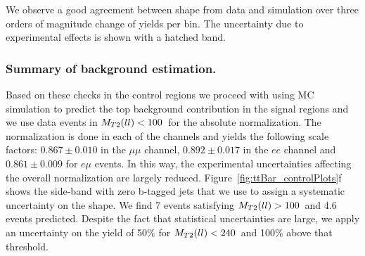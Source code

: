 We observe a good agreement between \mtll shape from data and simulation over three orders of magnitude change of yields per bin. 
The uncertainty due to experimental effects is shown with a hatched band.

\subsubsection{Summary of \texorpdfstring{\ttbar}{ttbar} background estimation.}

Based on these checks in the control regions we proceed with using MC simulation to predict the top background contribution in the signal regions and we use data events in $M_{T2}(ll) <100$~\GeV for the absolute normalization. 
The normalization is done in each of the channels and yields the following scale factors: $0.867\pm0.010$ in the $\mu\mu$ channel, $0.892\pm0.017$ in the $ee$ channel and $0.861 \pm 0.009$ for $e\mu$ events.
In this way, the experimental uncertainties affecting the overall normalization are largely reduced.
Figure~\ref{fig:ttBar_controlPlots}f shows the side-band with zero b-tagged jets that we use to assign a systematic uncertainty on the \ttbar shape. 
We find 7 events satisfying $M_{T2}(ll)>100$~\GeV and 4.6 events predicted. Despite the fact that statistical uncertainties are large, we apply an uncertainty on the \mtll yield of 50\% for $M_{T2}(ll)<240$~\GeV and 100\% above that threshold.


